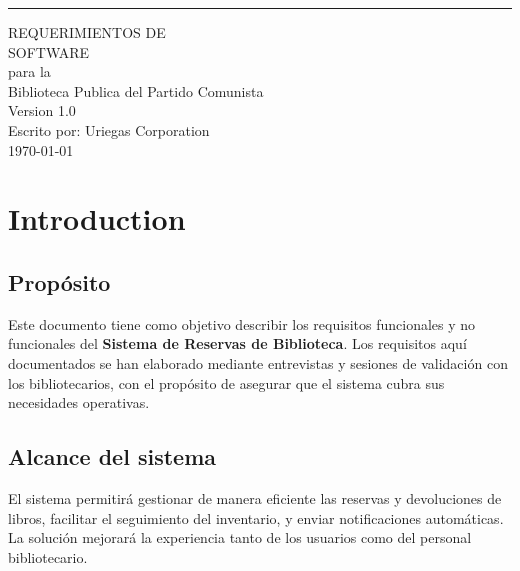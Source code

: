 \documentclass{scrreprt}
\date{}
\def\myversion{1.0 }
\begin{document}
\begin{flushright}
    \rule{16cm}{5pt}\vskip1cm
    \begin{bfseries}
        \Huge{REQUERIMIENTOS DE\\ SOFTWARE}\\
        \vspace{1.5cm}
        para la\\
        \vspace{1.5cm}
        Biblioteca Publica del Partido Comunista\\
        \vspace{1.5cm}
        \LARGE{Version \myversion}\\
        \vspace{1.5cm}
        Escrito por: Uriegas Corporation\\
        \vspace{1.5cm}
        \today\\
    \end{bfseries}
\end{flushright}

\tableofcontents

\chapter{Introduction}

\section{Propósito}
Este documento tiene como objetivo describir los requisitos funcionales y no funcionales del \textbf{Sistema de Reservas de Biblioteca}. Los requisitos aquí documentados se han elaborado mediante entrevistas y sesiones de validación con los bibliotecarios, con el propósito de asegurar que el sistema cubra sus necesidades operativas.

\section{Alcance del sistema}
El sistema permitirá gestionar de manera eficiente las reservas y devoluciones de libros, facilitar el seguimiento del inventario, y enviar notificaciones automáticas. La solución mejorará la experiencia tanto de los usuarios como del personal bibliotecario.
\end{document}
